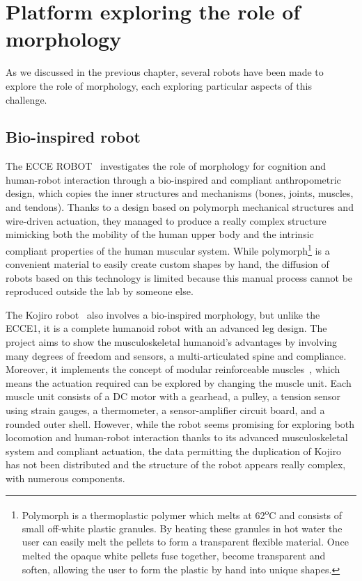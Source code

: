 \section{Platform exploring the role of morphology} %

As we discussed in the previous chapter, several robots have been made to explore the role of morphology, each exploring particular aspects of this challenge.

\subsection{Bio-inspired robot} %
\label{sub:compliant_robot}

The ECCE ROBOT~\parencite{marques2010ecce1} investigates the role of morphology for cognition and human-robot interaction through a bio-inspired and compliant anthropometric design, which copies the inner structures and mechanisms (bones, joints, muscles, and tendons). Thanks to a design based on polymorph mechanical structures and wire-driven actuation, they managed to produce a really complex structure mimicking both the mobility of the human upper body and the intrinsic compliant properties of the human muscular system.
While polymorph\footnote{Polymorph is a thermoplastic polymer which melts at 62\textsuperscript{o}C and consists of small off-white plastic granules. By heating these granules in hot water the user can easily melt the pellets to form a transparent flexible material. Once melted the opaque white pellets fuse together, become transparent and soften, allowing the user to form the plastic by hand into unique shapes.} is a convenient material to easily create custom shapes by hand, the diffusion of robots based on this technology is limited because this manual process cannot be reproduced outside the lab by someone else.

The Kojiro robot~\parencite{mizuuchi2007advanced} also involves a bio-inspired morphology, but unlike the ECCE1, it is a complete humanoid robot with an advanced leg design. The project aims to show the musculoskeletal humanoid’s advantages by involving many degrees of freedom and sensors, a multi-articulated spine and compliance. Moreover,
it implements the concept of modular reinforceable muscles~\cite{mizuuchi2004design}, which means the actuation required can be explored by changing the muscle unit. Each muscle unit consists of a DC motor with a gearhead, a pulley, a tension sensor using strain gauges, a thermometer, a sensor-amplifier circuit board, and a rounded outer shell.
However, while the robot seems promising for exploring both locomotion and human-robot interaction thanks to its advanced musculoskeletal system and compliant actuation, the data permitting the duplication of Kojiro has not been distributed and the structure of the robot appears really complex, with numerous components.


